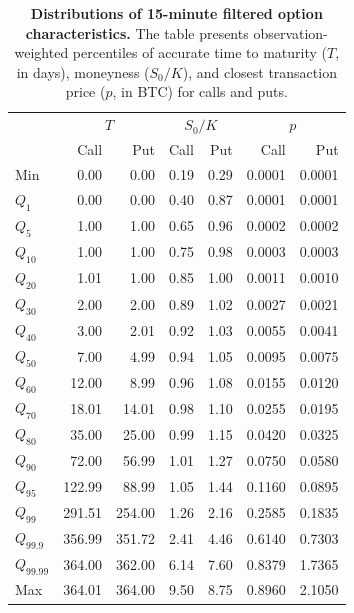 \begin{table}[htbp]
\centering
\begin{tabular}{lrrrrrr}
\hline
 & \multicolumn{2}{c}{$T$} & \multicolumn{2}{c}{$S_0/K$} & \multicolumn{2}{c}{$p$} \\
 & Call & Put & Call & Put & Call & Put \\
\hline
Min & 0.00 & 0.00 & 0.19 & 0.29 & 0.0001 & 0.0001 \\
$Q_1$ & 0.00 & 0.00 & 0.40 & 0.87 & 0.0001 & 0.0001 \\
$Q_5$ & 1.00 & 1.00 & 0.65 & 0.96 & 0.0002 & 0.0002 \\
$Q_{10}$ & 1.00 & 1.00 & 0.75 & 0.98 & 0.0003 & 0.0003 \\
$Q_{20}$ & 1.01 & 1.00 & 0.85 & 1.00 & 0.0011 & 0.0010 \\
$Q_{30}$ & 2.00 & 2.00 & 0.89 & 1.02 & 0.0027 & 0.0021 \\
$Q_{40}$ & 3.00 & 2.01 & 0.92 & 1.03 & 0.0055 & 0.0041 \\
$Q_{50}$ & 7.00 & 4.99 & 0.94 & 1.05 & 0.0095 & 0.0075 \\
$Q_{60}$ & 12.00 & 8.99 & 0.96 & 1.08 & 0.0155 & 0.0120 \\
$Q_{70}$ & 18.01 & 14.01 & 0.98 & 1.10 & 0.0255 & 0.0195 \\
$Q_{80}$ & 35.00 & 25.00 & 0.99 & 1.15 & 0.0420 & 0.0325 \\
$Q_{90}$ & 72.00 & 56.99 & 1.01 & 1.27 & 0.0750 & 0.0580 \\
$Q_{95}$ & 122.99 & 88.99 & 1.05 & 1.44 & 0.1160 & 0.0895 \\
$Q_{99}$ & 291.51 & 254.00 & 1.26 & 2.16 & 0.2585 & 0.1835 \\
$Q_{99.9}$ & 356.99 & 351.72 & 2.41 & 4.46 & 0.6140 & 0.7303 \\
$Q_{99.99}$ & 364.00 & 362.00 & 6.14 & 7.60 & 0.8379 & 1.7365 \\
Max & 364.01 & 364.00 & 9.50 & 8.75 & 0.8960 & 2.1050 \\
\hline
\end{tabular}
\caption{\textbf{Distributions of 15-minute filtered option characteristics.} The table presents observation-weighted percentiles of accurate time to maturity ($T$, in days), moneyness ($S_0/K$), and closest transaction price ($p$, in BTC) for calls and puts.}
\label{tab:filtered_option_characteristics}
\end{table}




